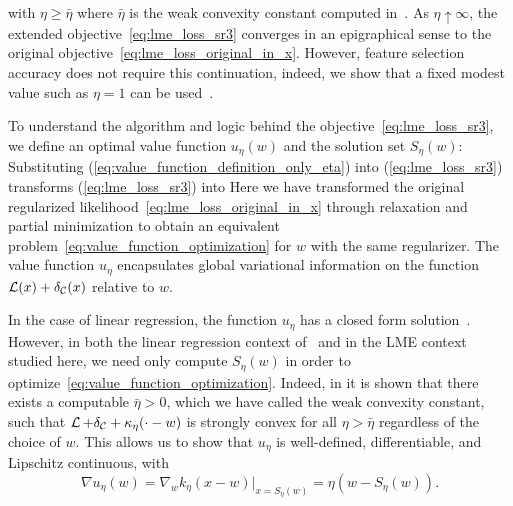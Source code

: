 with $\eta\ge\bar\eta$ where $\bar \eta$ is the weak convexity constant
computed in~\cite[Section 5.1]{Theory1}.
As $\eta \uparrow \infty$, the extended objective~\eqref{eq:lme_loss_sr3} converges in an epigraphical sense to the original objective~\eqref{eq:lme_loss_original_in_x}. 
However, feature selection accuracy does not require this continuation, 
indeed, we show that a fixed 
modest value such as $\eta=1$ can be used~\citep{Zheng2019SR3}.

To understand the algorithm and logic behind the objective~\eqref{eq:lme_loss_sr3}, we define an optimal value function $u_\eta(w)$ and the solution set $S_\eta(w)$:
Substituting (\ref{eq:value_function_definition_only_eta}) into (\ref{eq:lme_loss_sr3}) 
transforms (\ref{eq:lme_loss_sr3}) into 
Here we have transformed the original regularized likelihood~\eqref{eq:lme_loss_original_in_x}  %
through relaxation and partial 
minimization to obtain an equivalent problem~\eqref{eq:value_function_optimization} 
for $w$ with the same regularizer. The value function $u_\eta$ encapsulates 
global variational information on the function $\operatorname{\mathcal{L}}(x) + \delta_{\mathcal{C}}(x)$
relative to $w$.

In the case of linear regression, 
the function $u_\eta$ has a closed form solution~\cite{Zheng2019SR3}. However, in both  the linear regression context of~\cite{Zheng2019SR3} 
and in the LME context studied here, we need only compute $S_\eta(w)$ 
in order to optimize~\eqref{eq:value_function_optimization}. 
Indeed, in \cite[Section 5]{Theory1} it is shown that 
there exists a computable $\bar\eta>0$, which we have called the weak convexity constant, such that
$\operatorname{\mathcal{L}}+\delta_{\mathcal{C}}+\kappa_\eta(\cdot -w)$ is strongly convex for all 
$\eta>\bar\eta$ regardless of the choice of $w$. This allows us to show
that 
$u_\eta$ is well-defined, 
differentiable, and Lipschitz continuous, with
\begin{equation}\label{eq:grad_value_function_explicit}
\nabla u_\eta(w) = \nabla_w k_\eta(x-w)|_{x = S_\eta(w)}=\eta(w-S_\eta(w)) .  
\end{equation}

